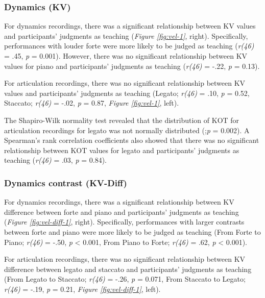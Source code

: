 \documentclass[
  man,floatsintext]{apa6}
\begin{document}
\hypertarget{dynamics-kv}{%
\subsubsection{Dynamics (KV)}\label{dynamics-kv}}

For dynamics recordings, there was a significant relationship between KV values and participants' judgments as teaching (\emph{Figure \ref{fig:vel-1}}, right). Specifically, performances with louder forte were more likely to be judged as teaching (\emph{r(46)} = .45, \emph{p} = 0.001). However, there was no significant relationship between KV values for piano and participants' judgments as teaching (\emph{r(46)} = -.22, \emph{p} = 0.13).

For articulation recordings, there was no significant relationship between KV values and participants' judgments as teaching (Legato; \emph{r(46)} = .10, \emph{p} = 0.52, Staccato; \emph{r(46)} = -.02, \emph{p} = 0.87, \emph{Figure \ref{fig:vel-1}}, left).

The Shapiro-Wilk normality test revealed that the distribution of KOT for articulation recordings for legato was not normally distributed (;\emph{p} = 0.002). A Spearman's rank correlation coefficients also showed that there was no significant relationship between KOT values for legato and participants' judgments as teaching (\emph{r(46)} = .03, \emph{p} = 0.84).

\hypertarget{dynamics-contrast-kv-diff}{%
\subsubsection{Dynamics contrast (KV-Diff)}\label{dynamics-contrast-kv-diff}}

For dynamics recordings, there was a significant relationship between KV difference between forte and piano and participants' judgments as teaching (\emph{Figure \ref{fig:vel-diff-1}}, right). Specifically, performances with larger contrasts between forte and piano were more likely to be judged as teaching (From Forte to Piano; \emph{r(46)} = -.50, \emph{p} \textless{} 0.001, From Piano to Forte; \emph{r(46)} = .62, \emph{p} \textless{} 0.001).

For articulation recordings, there was no significant relationship between KV difference between legato and staccato and participants' judgments as teaching (From Legato to Staccato; \emph{r(46)} = -.26, \emph{p} = 0.071, From Staccato to Legato; \emph{r(46)} = -.19, \emph{p} = 0.21, \emph{Figure \ref{fig:vel-diff-1}}, left).
\end{document}
